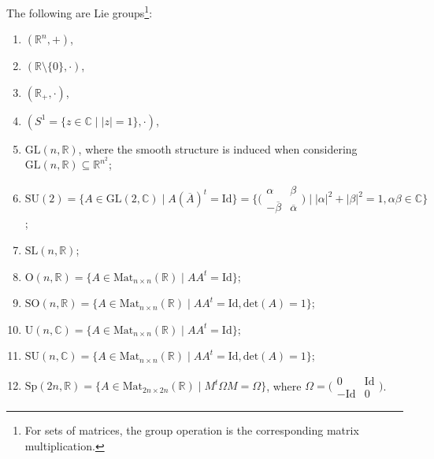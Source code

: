 \documentclass[misc]{subfiles}
\begin{document}
\begin{Exp}\label{Exp: Lie group}

    The following are Lie groups\footnote{For sets of matrices, the group operation is the corresponding matrix multiplication.}:
    \begin{enumerate}
    
        \item $(\mathbb{R}^n,+)$,

        \item $(\mathbb{R}\setminus\{0\},\cdot)$,

        \item $(\mathbb{R}_+,\cdot)$,

        \item $(S^1 = \{z\in\mathbb{C} \mid |z|=1\},\cdot)$,

        \item $\text{GL}(n,\mathbb{R})$, where the smooth structure is induced when considering $\text{GL}(n,\mathbb{R})\subseteq \mathbb{R}^{n^2}$;

        \item $\text{SU}(2) = \{A\in\text{GL}(2,\mathbb{C}) \mid A (\overline{A})^{t}=\text{Id}\} = \big\{ \big( \begin{smallmatrix} \alpha &\beta \\ -\overline{\beta} &\overline{\alpha} \end{smallmatrix} \big) \mid |\alpha|^2 + |\beta|^2 = 1, \alpha\beta\in\mathbb{C}\big\}$;

        \item $\text{SL}(n,\mathbb{R})$;

        \item $\text{O}(n,\mathbb{R}) = \{A\in\text{Mat}_{n\times n}(\mathbb{R}) \mid A A^t=\text{Id}\}$;

        \item $\text{SO}(n,\mathbb{R}) = \{A\in\text{Mat}_{n\times n}(\mathbb{R}) \mid A A^t=\text{Id}, \text{det}(A)=1\}$;

        \item $\text{U}(n,\mathbb{C}) = \{A\in\text{Mat}_{n\times n}(\mathbb{R}) \mid A A^t=\text{Id}\}$;

        \item $\text{SU}(n,\mathbb{C}) = \{A\in\text{Mat}_{n\times n}(\mathbb{R}) \mid A A^t=\text{Id}, \text{det}(A)=1\}$;

        \item $\text{Sp}(2n,\mathbb{R}) = \{A\in\text{Mat}_{2n\times 2n}(\mathbb{R}) \mid M^t\Omega M=\Omega\}$, where $\Omega = \big(\begin{smallmatrix} 0 &\text{Id} \\ -\text{Id} &0 \end{smallmatrix}\big)$.
    \end{enumerate}
\end{Exp}
\end{document}
